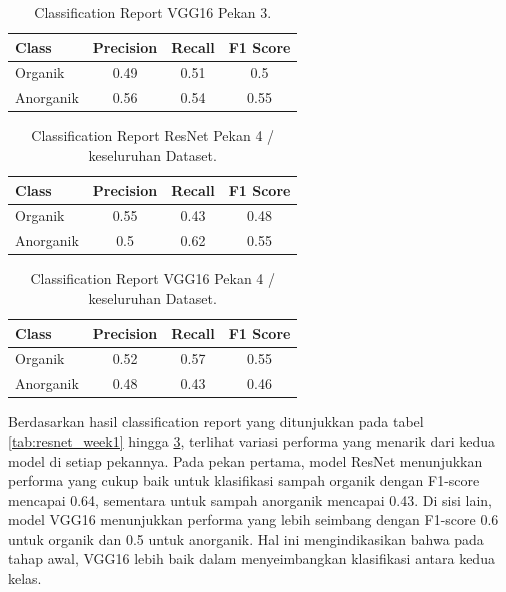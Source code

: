 \documentclass[12pt,a4paper]{article}
\begin{document}
\begin{table}[H]
\centering
\begin{tabular}{|l|c|c|c|}
    \hline
    \textbf{Class} & \textbf{Precision} & \textbf{Recall} & \textbf{F1 Score} \\
    \hline
    Organik & 0.49 & 0.51 & 0.5 \\
    Anorganik & 0.56 & 0.54 & 0.55 \\
    \hline
\end{tabular}
\caption{Classification Report VGG16 Pekan 3.}
\label{tab:vgg16_week3}
\end{table}

\begin{table}[H]
\centering
\begin{tabular}{|l|c|c|c|}
    \hline
    \textbf{Class} & \textbf{Precision} & \textbf{Recall} & \textbf{F1 Score} \\
    \hline
    Organik & 0.55 & 0.43 & 0.48 \\
    Anorganik & 0.5 & 0.62 & 0.55 \\
    \hline
\end{tabular}
\caption{Classification Report ResNet Pekan 4 / keseluruhan Dataset.}
\label{tab:resnet_week4}
\end{table}

\begin{table}[H]
\centering
\begin{tabular}{|l|c|c|c|}
    \hline
    \textbf{Class} & \textbf{Precision} & \textbf{Recall} & \textbf{F1 Score} \\
    \hline
    Organik & 0.52 & 0.57 & 0.55 \\
    Anorganik & 0.48 & 0.43 & 0.46 \\
    \hline
\end{tabular}
\caption{Classification Report VGG16 Pekan 4 / keseluruhan Dataset.}
\label{tab:vgg16_week4}
\end{table}

Berdasarkan hasil classification report yang ditunjukkan pada tabel \ref{tab:resnet_week1} hingga \ref{tab:vgg16_week4}, terlihat variasi performa yang menarik dari kedua model di setiap pekannya. Pada pekan pertama, model ResNet menunjukkan performa yang cukup baik untuk klasifikasi sampah organik dengan F1-score mencapai 0.64, sementara untuk sampah anorganik mencapai 0.43. Di sisi lain, model VGG16 menunjukkan performa yang lebih seimbang dengan F1-score 0.6 untuk organik dan 0.5 untuk anorganik. Hal ini mengindikasikan bahwa pada tahap awal, VGG16 lebih baik dalam menyeimbangkan klasifikasi antara kedua kelas.
\end{document}
